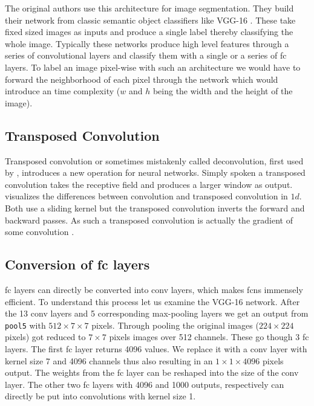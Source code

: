 The original authors use this architecture for image segmentation. They build their network from classic semantic object classifiers like VGG-16 \citep{simonyan_very_2014}. These take fixed sized images as inputs and produce a single label thereby classifying the whole image. Typically these networks produce high level features through a series of convolutional layers and classify them with a single or a series of \gls{fc} layers. To label an image pixel-wise with such an architecture we would have to forward the neighborhood of each pixel through the network which would introduce an  time complexity ($w$ and $h$ being the width and the height of the image).

\subsection{Transposed Convolution} %
\label{sub:conepts:fcn:deconv}

Transposed convolution or sometimes mistakenly called deconvolution, first used by \citet{zeiler_deconvolutional_2010}, introduces a new operation for neural networks. Simply spoken a transposed convolution takes the receptive field and produces a larger window as output.  visualizes the differences between convolution and transposed convolution in $1d$. Both use a sliding kernel but the transposed convolution inverts the forward and backward passes. As such a transposed convolution is actually the gradient of some convolution \citep{dumoulin_guide_2016}.

\subsection{Conversion of \gls{fc} layers}
\label{sub:concepts:fcn:fc_conversion}
\gls{fc} layers can directly be converted into \gls{conv} layers, which makes \glspl{fcn} immensely efficient. To understand this process let us examine the VGG-16 network. After the 13 \gls{conv} layers and 5  corresponding max-pooling layers we get an output from \texttt{pool5} with $512\times7\times7$ pixels. Through pooling the original images ($224\times224$ pixels) got reduced to $7\times7$ pixels images over 512 channels. These go though 3 \gls{fc} layers. The first \gls{fc} layer returns 4096 values. We replace it with a \gls{conv} layer with kernel size 7 and 4096 channels thus also resulting in an $1\times1\times4096$ pixels output. The weights from the \gls{fc} layer can be reshaped into the size of the \gls{conv} layer. The other two \gls{fc} layers with 4096 and 1000 outputs, respectively can directly be put into convolutions with kernel size 1.

